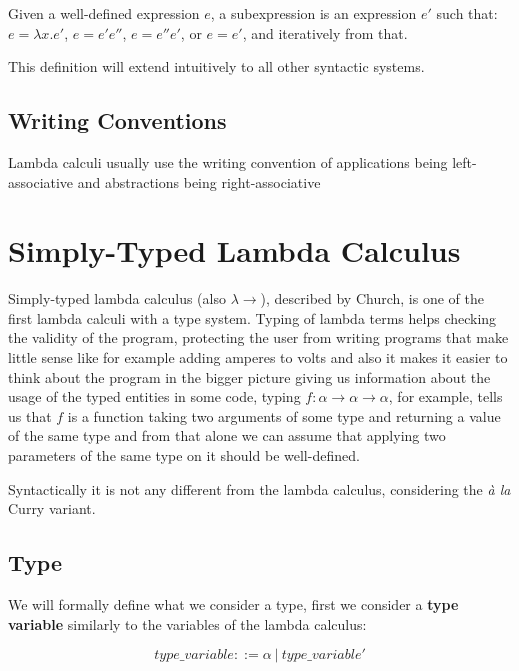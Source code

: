 \begin{defn}[Subexpression]
Given a well-defined expression $e$, a subexpression is an expression $e'$ such that: $e = \lambda x . e'$, $e = e' e''$, $e = e'' e'$, or $e = e'$, and iteratively from that.
\end{defn}

This definition will extend intuitively to all other syntactic systems.

\subsection{Writing Conventions}

Lambda calculi usually use the writing convention of applications being left-associative and abstractions being right-associative


\section{Simply-Typed Lambda Calculus }

Simply-typed lambda calculus (also $\lambda\rightarrow$), described by Church, is one of the first %
lambda calculi with a type system. Typing of lambda terms helps checking the validity of the program, protecting the user from writing programs that make little sense like for example adding amperes to volts \cite{barendregt1992lambda} and also it makes it easier to think about the program in the bigger picture giving us information about the usage of the typed entities in some code, typing $f : \alpha \rightarrow \alpha \rightarrow \alpha$, for example, tells us that $f$ is a function taking two arguments of some type and returning a value of the same type and from that alone we can assume that applying two parameters of the same type on it should be well-defined.

Syntactically it is not any different from the lambda calculus, considering the \emph{\`a la} Curry variant. \cite{barendregt1992lambda}

\subsection{Type}

We will formally define what we consider a type, first we consider a \textbf{type variable} similarly to the variables of the lambda calculus:

\begin{defn}
    $$type\_variable ::= \alpha\ |\ type\_variable'$$
\end{defn}

